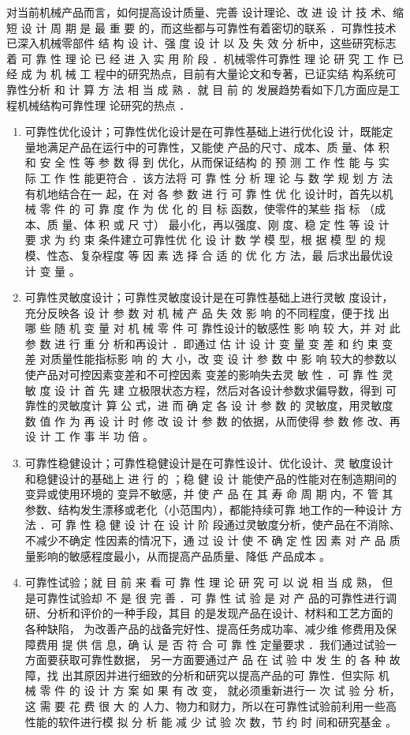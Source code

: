 \documentclass[a4paper,12pt]{article}
\begin{document}
对当前机械产品而言，如何提高设计质量、完善 设计理论、改 进 设 计 技 术、缩 短 设 计 周 期 是 最 重 要 的，而这些都与可靠性有着密切的联系 ．可靠性技术已深入机械零部件 结 构 设 计、强 度 设 计 以 及 失 效 分 析中，这些研究标志 着 可 靠 性 理 论 已 经 进 入 实 用 阶 段 ．机械零件可靠性 理 论 研 究 工 作 已 经 成 为 机 械 工 程中的研究热点，目前有大量论文和专著，已证实结 构系统可靠性分析 和 计 算 方 法 相 当 成 熟 ．就 目 前 的
发展趋势看如下几方面应是工程机械结构可靠性理 论研究的热点 ．
\begin{enumerate}
	\item 可靠性优化设计；可靠性优化设计是在可靠性基础上进行优化设 计，既能定量地满足产品在运行中的可靠性，又能使 产品的尺寸、成本、质 量、体 积 和 安 全 性 等 参 数 得 到 优化，从而保证结构 的 预 测 工 作 性 能 与 实 际 工 作 性 能更符合 ．该方法将 可 靠 性 分 析 理 论 与 数 学 规 划 方 法有机地结合在一 起，在 对 各 参 数 进 行 可 靠 性 优 化 设计时，首先以机械 零 件 的 可 靠 度 作 为 优 化 的 目 标 函数，使零件的某些 指 标 （成 本、质 量、体 积 或 尺 寸） 最小化，再以强度、刚 度、稳 定 性 等 设 计 要 求 为 约 束 条件建立可靠性优 化 设 计 数 学 模 型，根 据 模 型 的 规 模、性态、复杂程度 等 因 素 选 择 合 适 的 优 化 方 法，最 后求出最优设 计 变 量 。
	\item 可靠性灵敏度设计；可靠性灵敏度设计是在可靠性基础上进行灵敏 度设计，充分反映各 设 计 参 数 对 机 械 产 品 失 效 影 响 的不同程度，便于找 出 哪 些 随 机 变 量 对 机 械 零 件 可 靠性设计的敏感性 影 响 较 大，并 对 此 参 数 进 行 重 分 析和再设计 ．即通过 估 计 设 计 变 量 变 差 和 约 束 变 差 对质量性能指标影 响 的 大 小，改 变 设 计 参 数 中 影 响 较大的参数以使产品对可控因素变差和不可控因素 变差的影响失去灵 敏 性 ．可 靠 性 灵 敏 度 设 计 首 先 建 立极限状态方程，然后对各设计参数求偏导数，得到 可靠性的灵敏度计 算 公 式，进 而 确 定 各 设 计 参 数 的 灵敏度，用灵敏度数 值 作 为 再 设 计 时 修 改 设 计 参 数 的依据，从而使得 参 数 修 改、再 设 计 工 作 事 半 功 倍 。
	\item 可靠性稳健设计；可靠性稳健设计是在可靠性设计、优化设计、灵 敏度设计和稳健设计的基础上 进 行 的 ；稳 健 设 计 能使产品的性能对在制造期间的变异或使用环境的 变异不敏感，并 使 产 品 在 其 寿 命 周 期 内，不 管 其 参数、结构发生漂移或老化（小范围内），都能持续可靠 地工作的一种设计 方 法 ．可 靠 性 稳 健 设 计 在 设 计 阶 段通过灵敏度分析，使产品在不消除、不减少不确定 性因素的情况下，通 过 设 计 使 不 确 定 性 因 素 对 产 品 质量影响的敏感程度最小，从而提高产品质量、降低 产品成本 。
	\item 可靠性试验；就 目 前 来 看 可 靠 性 理 论 研 究 可 以 说 相 当 成 熟， 但是可靠性试验却 不 是 很 完 善 ．可 靠 性 试 验 是 对 产 品的可靠性进行调研、分析和评价的一种手段，其目 的是发现产品在设计、材料和工艺方面的各种缺陷， 为改善产品的战备完好性、提高任务成功率、减少维 修费用及保障费用 提 供 信 息，确 认 是 否 符 合 可 靠 性 定量要求 ．我们通过试验一方面要获取可靠性数据， 另一方面要通过产 品 在 试 验 中 发 生 的 各 种 故 障，找 出其原因并进行细致的分析和研究以提高产品的可 靠性．但实际 机 械 零 件 的 设 计 方 案 如 果 有 改 变， 就必须重新进行一 次 试 验 分 析，这 需 要 花 费 很 大 的 人力、物力和财力，所以在可靠性试验前利用一些高 性能的软件进行模 拟 分 析 能 减 少 试 验 次 数，节 约 时 间和研究基金 。

\end{enumerate}
\end{document}
